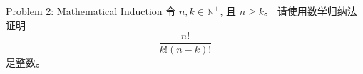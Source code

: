 
\begin{frame}{}
  \begin{exampleblock}{Problem 2: Mathematical Induction}
    令 $n, k \in \mathbb{N}^{+}$, 且 $n \ge k$。
    请使用数学归纳法证明 
    \[
      \frac{n!}{k! (n-k)!}
    \]
    是整数。
  \end{exampleblock}
\end{frame}
